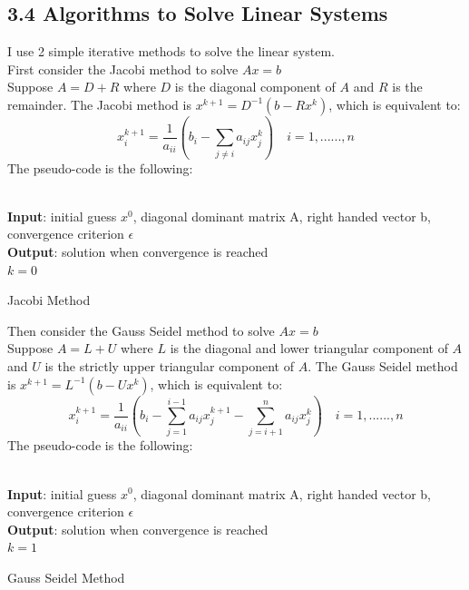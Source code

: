 \documentclass{article}
\begin{document}
\subsection*{3.4 Algorithms to Solve Linear Systems}
I use 2 simple iterative methods to solve the linear system.\\
First consider the Jacobi method to solve $Ax = b$\\
Suppose $A = D + R$ where $D$ is the diagonal component of $A$ and $R$ is the remainder. The Jacobi method is $x^{k+1} = D^{-1}(b - Rx^{k})$, which is equivalent to:
\[
x_i^{k+1} = \frac{1}{a_{ii}}(b_i - \sum_{j \neq i}a_{ij}x_j^{k}) \quad i = 1, ......, n
\]
The pseudo-code is the following:\\ \\
\begin{algorithm}[H]
\SetAlgoLined
 \textbf{Input}: initial guess $x^0$, diagonal dominant matrix A, right handed vector b, convergence criterion $\epsilon$\\
 \textbf{Output}: solution when convergence is reached\\
 $k = 0$\\
 \caption{Jacobi Method}
\end{algorithm}
Then consider the Gauss Seidel method to solve $Ax = b$\\
Suppose $A = L + U$ where $L$ is the diagonal and lower triangular component of $A$ and $U$ is the strictly upper triangular component of $A$. The Gauss Seidel method is $x^{k+1} = L^{-1}(b - Ux^{k})$, which is equivalent to:
\[
x_i^{k+1} = \frac{1}{a_{ii}}(b_i - \sum_{j = 1}^{i-1}a_{ij}x_j^{k+1} -  \sum_{j = i+1}^{n}a_{ij}x_j^{k}) \quad i = 1, ......, n
\]
The pseudo-code is the following:\\ \\
\begin{algorithm}[H]
\SetAlgoLined
 \textbf{Input}: initial guess $x^0$, diagonal dominant matrix A, right handed vector b, convergence criterion $\epsilon$\\
 \textbf{Output}: solution when convergence is reached\\
 $k = 1$\\
 \caption{Gauss Seidel Method}
\end{algorithm}
\end{document}
